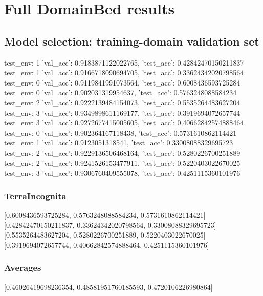 \documentclass{article}
\begin{document}
\section{Full DomainBed results}

\subsection{Model selection: training-domain validation set}
test_env: 1
{'val_acc': 0.9183871122022765, 'test_acc': 0.42842470150211837}
test_env: 1
{'val_acc': 0.9166718090694705, 'test_acc': 0.33624342020798564}
test_env: 0
{'val_acc': 0.9119841991073564, 'test_acc': 0.6008436593725284}
test_env: 0
{'val_acc': 0.902031319954637, 'test_acc': 0.5763248088584234}
test_env: 2
{'val_acc': 0.9222139484154073, 'test_acc': 0.5535264483627204}
test_env: 3
{'val_acc': 0.9349898611169177, 'test_acc': 0.3919694072657744}
test_env: 3
{'val_acc': 0.9272677415005605, 'test_acc': 0.40662842574888464}
test_env: 0
{'val_acc': 0.902364167118438, 'test_acc': 0.5731610862114421}
test_env: 1
{'val_acc': 0.9123051318541, 'test_acc': 0.33008088329695723}
test_env: 2
{'val_acc': 0.9229136506468164, 'test_acc': 0.5280226700251889}
test_env: 2
{'val_acc': 0.9241526153477911, 'test_acc': 0.5220403022670025}
test_env: 3
{'val_acc': 0.9306760409555078, 'test_acc': 0.4251115360101976}

\subsubsection{TerraIncognita}
[0.6008436593725284, 0.5763248088584234, 0.5731610862114421]
[0.42842470150211837, 0.33624342020798564, 0.33008088329695723]
[0.5535264483627204, 0.5280226700251889, 0.5220403022670025]
[0.3919694072657744, 0.40662842574888464, 0.4251115360101976]

\begin{center}
\end{center}

\subsubsection{Averages}
[0.46026419698236354, 0.48581951760185593, 0.4720106226980864]

\begin{center}
\end{center}
\end{document}
